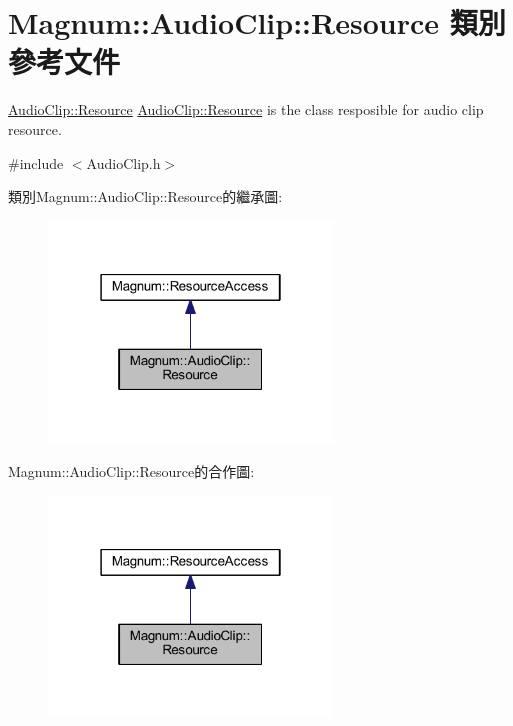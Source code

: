 \hypertarget{class_magnum_1_1_audio_clip_1_1_resource}{}\section{Magnum\+:\+:Audio\+Clip\+:\+:Resource 類別 參考文件}
\label{class_magnum_1_1_audio_clip_1_1_resource}


\hyperlink{class_magnum_1_1_audio_clip_1_1_resource}{Audio\+Clip\+::\+Resource} \hyperlink{class_magnum_1_1_audio_clip_1_1_resource}{Audio\+Clip\+::\+Resource} is the class resposible for audio clip resource.  




{\ttfamily \#include $<$Audio\+Clip.\+h$>$}



類別\+Magnum\+:\+:Audio\+Clip\+:\+:Resource的繼承圖\+:\nopagebreak
\begin{figure}[H]
\begin{center}
\leavevmode
\includegraphics[width=214pt]{class_magnum_1_1_audio_clip_1_1_resource__inherit__graph}
\end{center}
\end{figure}


Magnum\+:\+:Audio\+Clip\+:\+:Resource的合作圖\+:\nopagebreak
\begin{figure}[H]
\begin{center}
\leavevmode
\includegraphics[width=214pt]{class_magnum_1_1_audio_clip_1_1_resource__coll__graph}
\end{center}
\end{figure}
